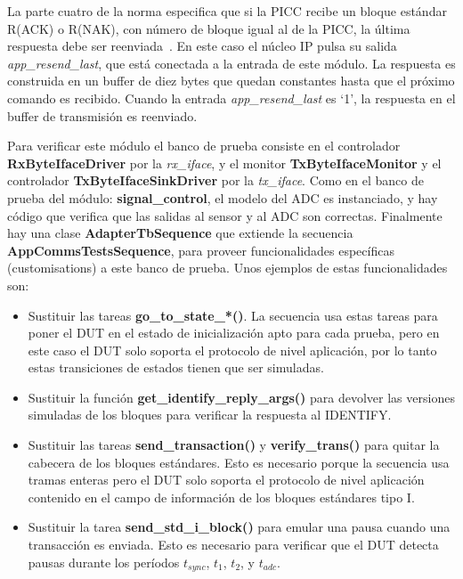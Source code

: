 \documentclass[a4paper, twoside, 11pt]{report}
\begin{document}
\FloatBarrier

La parte cuatro de la norma especifica que si la PICC recibe un bloque estándar R(ACK) o R(NAK), con número de bloque igual al de la PICC, la última respuesta debe ser reenviada~\cite{iso14443-4}. En este caso el núcleo IP pulsa su salida \textit{app\_resend\_last}, que está conectada a la entrada de este módulo. La respuesta es construida en un buffer de diez bytes que quedan constantes hasta que el próximo comando es recibido. Cuando la entrada \textit{app\_resend\_last} es ‘1’, la respuesta en el buffer de transmisión es reenviado.

Para verificar este módulo el banco de prueba consiste en el controlador \textbf{RxByteIfaceDriver} por la \textit{rx\_iface}, y el monitor \textbf{TxByteIfaceMonitor} y el controlador \textbf{TxByteIfaceSinkDriver} por la \textit{tx\_iface}. Como en el banco de prueba del módulo: \textbf{signal\_control}, el modelo del ADC es instanciado, y hay código que verifica que las salidas al sensor y al ADC son correctas. Finalmente hay una clase \textbf{AdapterTbSequence} que extiende la secuencia \textbf{AppCommsTestsSequence}, para proveer funcionalidades específicas (customisations) a este banco de prueba. Unos ejemplos de estas funcionalidades son:

\begin{itemize}
  \item Sustituir las tareas \textbf{go\_to\_state\_*()}. La secuencia usa estas tareas para poner el DUT en el estado de inicialización apto para cada prueba, pero en este caso el DUT solo soporta el protocolo de nivel aplicación, por lo tanto estas transiciones de estados tienen que ser simuladas.
  \item Sustituir la función \textbf{get\_identify\_reply\_args()} para devolver las versiones simuladas de los bloques para verificar la respuesta al IDENTIFY.
  \item Sustituir las tareas \textbf{send\_transaction()} y \textbf{verify\_trans()} para quitar la cabecera de los bloques estándares. Esto es necesario porque la secuencia usa tramas enteras pero el DUT solo soporta el protocolo de nivel aplicación contenido en el campo de información de los bloques estándares tipo I.
  \item Sustituir la tarea \textbf{send\_std\_i\_block()} para emular una pausa cuando una transacción es enviada. Esto es necesario para verificar que el DUT detecta pausas durante los períodos $t_{sync}$, $t_1$, $t_2$, y $t_{adc}$.
\end{itemize}
\end{document}
